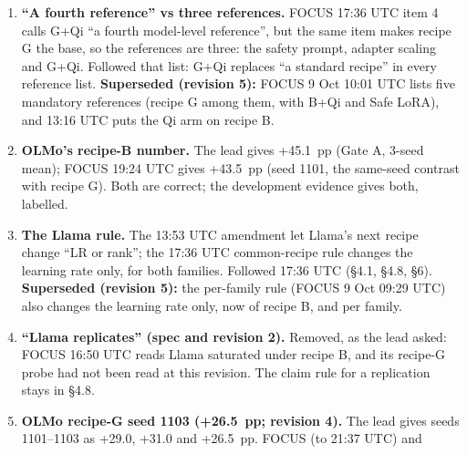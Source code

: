 \documentclass{article}
\theoremstyle{plain}
\theoremstyle{definition}
\theoremstyle{remark}
\begin{document}
\begin{enumerate}
{        3).} The lead: if Llama under recipe G ``reads partial'', G is the
        common recipe; ``if not'', both families step down the learning rate
        together. FOCUS 17:36 UTC: G is the common recipe if Llama's probe
        \emph{qualifies} (meets every frozen family-probe bar, not only the
        partial class); both families step down only if Llama \emph{saturates};
        if no rung qualifies for both (for example Llama weak, or OLMo below
        20~pp where Llama turns partial), no common recipe exists and the user
        decides. Followed FOCUS (\S{}4.1). \textbf{Superseded (revision 5):}
        FOCUS 9 Oct 09:29 UTC replaces the common-recipe rule with the
        per-family learning-rate rule.
  \item \textbf{``A fourth reference'' vs three references.} FOCUS 17:36 UTC
        item 4 calls G+Qi ``a fourth model-level reference'', but the same item
        makes recipe G the base, so the references are three: the safety prompt,
        adapter scaling and G+Qi. Followed that list: G+Qi replaces ``a standard
        recipe'' in every reference list. \textbf{Superseded (revision 5):}
        FOCUS 9 Oct 10:01 UTC lists five mandatory references (recipe G among
        them, with B+Qi and Safe LoRA), and 13:16 UTC puts the Qi arm on recipe
        B.
  \item \textbf{OLMo's recipe-B number.} The lead gives +45.1~pp (Gate A, 3-seed
        mean); FOCUS 19:24 UTC gives +43.5~pp (seed 1101, the same-seed contrast
        with recipe G). Both are correct; the development evidence gives both,
        labelled.
  \item \textbf{The Llama rule.} The 13:53 UTC amendment let Llama's next recipe
        change ``LR or rank''; the 17:36 UTC common-recipe rule changes the
        learning rate only, for both families. Followed 17:36 UTC (\S{}4.1,
        \S{}4.8, \S{}6). \textbf{Superseded (revision 5):} the per-family rule
        (FOCUS 9 Oct 09:29 UTC) also changes the learning rate only, now of
        recipe B, and per family.
  \item \textbf{``Llama replicates'' (spec and revision 2).} Removed, as the
        lead asked: FOCUS 16:50 UTC reads Llama saturated under recipe B, and
        its recipe-G probe had not been read at this revision. The claim rule
        for a replication stays in \S{}4.8.
  \item \textbf{OLMo recipe-G seed 1103 (+26.5~pp; revision 4).} The lead gives
        seeds 1101--1103 as +29.0, +31.0 and +26.5~pp. FOCUS (to 21:37 UTC) and

\end{enumerate}
\end{document}
